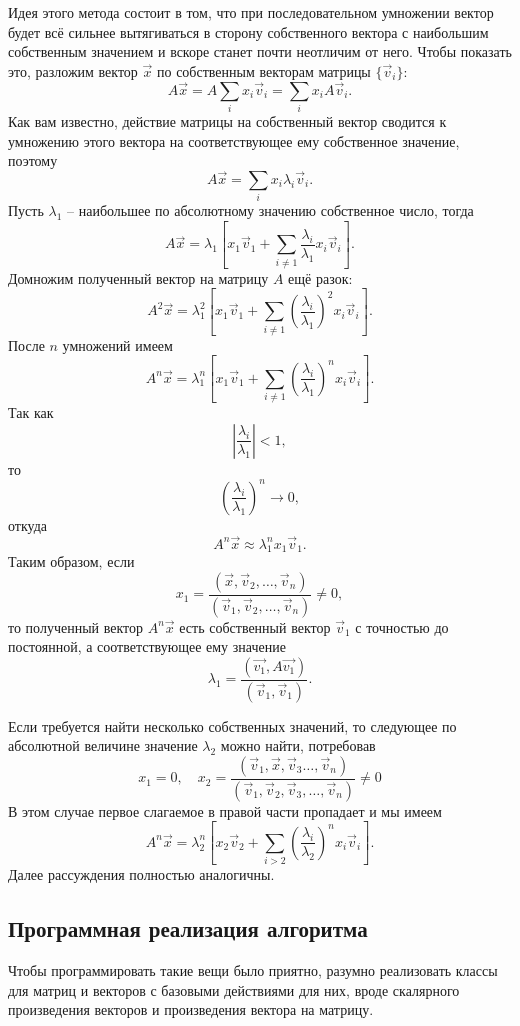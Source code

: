 \documentclass[a4paper,12pt]{article}
\begin{document}
	Идея этого метода состоит в том, что при последовательном умножении вектор будет всё сильнее вытягиваться в сторону собственного вектора с наибольшим собственным значением и вскоре станет почти неотличим от него. Чтобы показать это, разложим вектор \( \vec{x} \) по собственным векторам матрицы \( \{ \vec{v}_i \} \):
	\[
		A\vec{x} = A \sum_i x_i \vec{v}_i = \sum_i x_i A\vec{v}_i.
	\]
	Как вам известно, действие матрицы на собственный вектор сводится к умножению этого вектора на соответствующее ему собственное значение, поэтому
	\[
		A\vec{x} = \sum_i x_i \lambda_i \vec{v}_i.
	\]
	Пусть \( \lambda_1 \) -- наибольшее по абсолютному значению собственное число, тогда
	\[
		A\vec{x} = \lambda_1 \left[x_1 \vec{v}_1 + \sum_{i \neq 1} \frac{\lambda_i}{\lambda_1} x_i \vec{v}_i\right].
	\]
	Домножим полученный вектор на матрицу \(A\) ещё разок:
	\[
		A^2\vec{x} = \lambda_1^2 \left[x_1 \vec{v}_1 + \sum_{i \neq 1} \left(\frac{\lambda_i}{\lambda_1}\right)^2 x_i \vec{v}_i\right].
	\]
	После \( n \) умножений имеем
	\[
		A^n\vec{x} = \lambda_1^n \left[x_1 \vec{v}_1 + \sum_{i \neq 1} \left(\frac{\lambda_i}{\lambda_1}\right)^n x_i \vec{v}_i\right].
	\]
	Так как
	\[
		\left|\frac{\lambda_i}{\lambda_1}\right| < 1,
	\]
	то
	\[
		\left(\frac{\lambda_i}{\lambda_1}\right)^n \to 0,
	\]
	откуда
	\[
		A^n\vec{x} \approx \lambda_1^n x_1 \vec{v}_1.
	\]
	Таким образом, если
	\[
		x_1 = \frac{(\vec{x}, \vec{v}_2,\ldots,\vec{v}_n)}{(\vec{v}_1,\vec{v}_2,\ldots,\vec{v}_n)} \neq 0,
	\]
	то полученный вектор \( A^n\vec{x} \) есть собственный вектор \( \vec{v}_1 \) с точностью до постоянной, а соответствующее ему значение
	\[
		\lambda_1 = \frac{(\vec{v_1}, A\vec{v_1})}{(\vec{v}_1, \vec{v}_1)}.
	\]

	Если требуется найти несколько собственных значений, то следующее по абсолютной величине значение \( \lambda_2 \) можно найти, потребовав
	\[
		x_1 = 0,\quad x_2 = \frac{(\vec{v}_1,\vec{x},\vec{v}_3 \ldots,\vec{v}_n)}{(\vec{v}_1,\vec{v}_2,\vec{v}_3,\ldots,\vec{v}_n)} \neq 0
	\]
	В этом случае первое слагаемое в правой части пропадает и мы имеем
	\[
		A^n\vec{x} = \lambda_2^n \left[x_2 \vec{v}_2 + \sum_{i > 2} \left(\frac{\lambda_i}{\lambda_2}\right)^n x_i \vec{v}_i\right].
	\]
	Далее рассуждения полностью аналогичны.

	\subsection{Программная реализация алгоритма}
	Чтобы программировать такие вещи было приятно, разумно реализовать классы для матриц и векторов с базовыми действиями для них, вроде скалярного произведения векторов и произведения вектора на матрицу.
\end{document}
